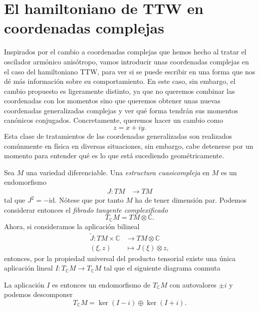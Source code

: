 \documentclass[11pt,a4paper,twoside]{article}
\theoremstyle{definition} \newtheorem{defn}[thm]{Definición}
\theoremstyle{definition} \newtheorem{ejemplo}[thm]{Ejemplo}
\theoremstyle{definition} \newtheorem{ejercicio}[thm]{Ejercicio}
\theoremstyle{remark} \newtheorem*{obs}{Observación}
\def\CC{\mathbb{C}}
\begin{document}
\section{El hamiltoniano de TTW en coordenadas complejas}
Inspirados por el cambio a coordenadas complejas que hemos hecho al tratar el oscilador armónico anisótropo, vamos introducir unas coordenadas complejas en el caso del hamiltoniano TTW, para ver si se puede escribir en una forma que nos dé más información sobre su comportamiento. En este caso, sin embargo, el cambio propuesto es ligeramente distinto, ya que no queremos combinar las coordenadas con los momentos sino que queremos obtener unas nuevas coordenadas generalizadas complejas y ver qué forma tendrán sus momentos canónicos conjugados. Concretamente, queremos hacer un cambio como
\begin{equation}
  z=x+iy.
\end{equation}
Esta clase de tratamientos de las coordenadas generalizadas son realizados comúnmente en física en diversas situaciones, sin embargo, cabe detenerse por un momento para entender qué es lo que está sucediendo geométricamente.

Sea $M$ una variedad diferenciable. Una \emph{estructura cuasicompleja} en $M$ es un endomorfismo
\begin{align*}
  J :TM&\longrightarrow TM
  \end{align*}
  tal que $J^2=-\mathrm{id}$. Nótese que por tanto $M$ ha de tener dimensión par. Podemos considerar entonces el \emph{fibrado tangente complexificado}
  \begin{equation*}
    T_{\CC}M=TM\otimes \CC.
  \end{equation*}
Ahora, si consideramos la aplicación bilineal
\begin{align*}
  \tilde{J} :TM \times \CC&\longrightarrow TM\otimes \CC\\ 
    (\xi,z) &\longmapsto J(\xi)\otimes z, 
  \end{align*}
  entonces, por la propiedad universal del producto tensorial existe una única aplicación lineal $I:T_{\CC}M \rightarrow T_{\CC}M$ tal que el siguiente diagrama conmuta
  \begin{center}
   \end{center}
   La aplicación $I$ es entonces un endomorfismo de $T_{\CC}M$ con autovalores $\pm i$ y podemos descomponer
   \begin{equation*}
     T_{\CC}M=\ker(I-i)\oplus \ker(I+i).
   \end{equation*}
\end{document}
